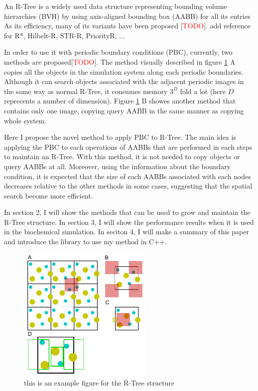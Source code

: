 \documentclass[10pt,letterpaper,twocolumn]{article}
\begin{document}
    An R-Tree is a widely used data structure representing bounding volume
hierarchies (BVH) by using axis-aligned bounding box (AABB) for all its entries
As its efficiency, many of its variants have been proposed [\textcolor{red}{TODO}].
add reference for R*, Hilbelt-R, STR-R, PriorityR, ...

    In order to use it with periodic boundary conditions (PBC), currently,
two methods are proposed[\textcolor{red}{TODO}]. The method visually described in
figure \ref{fig1} A copies all the objects in the simulation system
along each periodic boundaries. Although it can search objects associated with
the adjacent periodic images in the same way as normal R-Tree, it consumes
memory $3^D$ fold a lot (here $D$ reprecents a number of dimension). Figure
\ref{fig1} B showes another method that contains only one image,
copying query AABB in the same manner as copying whole system.

    Here I propose the novel method to apply PBC to R-Tree. The main idea is
applying the PBC to each operations of AABBs that are performed in each steps to
maintain an R-Tree. With this method, it is not needed to copy objects or query
AABBs at all. Moreover, using the information about the boundary condition,
it is expected that the size of each AABBs associated with each nodes decreases
relative to the other methods in some cases, suggesting that the spatial search
become more efficient.

    In section 2, I will show the methods that can be used to
grow and maintain the R-Tree structure. In section 3, I will show the performance
results when it is used in the biochemical simulation. In seciton 4, I will make
a summary of this paper and introduce the library to use my method in C++.

\begin{figure}[hbt]
    \includegraphics[width=6.5cm, bb=0 0 567 567]{fig1.eps}
    \caption{this is an example figure for the R-Tree structure}
    \label{fig1}
\end{figure}
\end{document}
